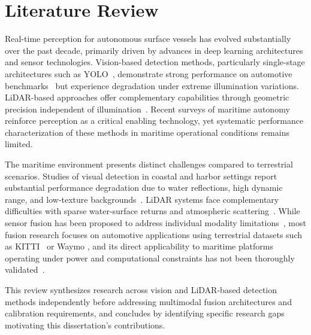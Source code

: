 \documentclass{erauthesis}
\begin{document}
\chapter{Literature Review} \label{litReview}

Real-time perception for autonomous surface vessels has evolved substantially over the past decade, primarily driven by advances in deep learning architectures and sensor technologies. %
Vision-based detection methods, particularly single-stage architectures such as YOLO~\cite{redmon2016}, demonstrate strong performance on automotive benchmarks~\cite{geiger2013} but experience degradation under extreme illumination variations.
\ac{LiDAR}-based approaches offer complementary capabilities through geometric precision independent of illumination~\cite{zhou2018}.
Recent surveys of maritime autonomy~\cite{bae2023, zhang2021, xue2025, ferreira2022, bai2022} reinforce perception as a critical enabling technology, yet systematic performance characterization of these methods in maritime operational conditions remains limited.

The maritime environment presents distinct challenges compared to terrestrial scenarios.
Studies of visual detection in coastal and harbor settings report substantial performance degradation due to water reflections, high dynamic range, and low-texture backgrounds~\cite{prasad2017}.
\ac{LiDAR} systems face complementary difficulties with sparse water-surface returns and atmospheric scattering~\cite{kunz2005}.
While sensor fusion has been proposed to address individual modality limitations~\cite{huang2024a, liang2022}, most fusion research focuses on automotive applications using terrestrial datasets such as KITTI~\cite{geiger2013} or Waymo \cite{sun2020}, and its direct applicability to maritime platforms operating under power and computational constraints has not been thoroughly validated~\cite{wang2020a}.

This review synthesizes research across vision and \ac{LiDAR}-based detection methods independently before addressing multimodal fusion architectures and calibration requirements, and concludes by identifying specific research gaps motivating this dissertation's contributions.
\end{document}
